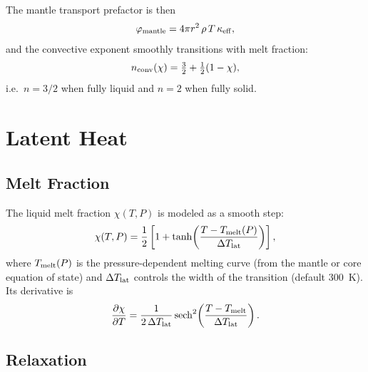 \documentclass{aastex631}
\newcommand{\pp}{\partial}
\newcommand{\Tmelt}{T_{\rm melt}}
\begin{document}
The mantle transport prefactor is then
\begin{equation}\label{eq:phi_mantle}
  \varphi_{\rm mantle}
  = 4\pi r^2\,\rho\,T\,\kappa_{\rm eff},
\end{equation}
and the convective exponent smoothly transitions with melt fraction:
\begin{equation}\label{eq:nconv_mantle}
  n_{\rm conv}(\chi)
  = \tfrac{3}{2} + \tfrac{1}{2}(1-\chi),
\end{equation}
i.e.\ $n=3/2$ when fully liquid and $n=2$ when fully solid.

\section{Latent Heat}\label{sec:latent}

\subsection{Melt Fraction}

The liquid melt fraction $\chi(T,P)$ is modeled as a smooth step:
\begin{equation}\label{eq:chi}
  \chi(T,P)
  = \frac{1}{2}\left[1 + \tanh\!\left(
      \frac{T - \Tmelt(P)}{\Delta T_{\rm lat}}
    \right)\right],
\end{equation}
where $\Tmelt(P)$ is the pressure-dependent melting curve (from the
mantle or core equation of state) and $\Delta T_{\rm lat}$ controls the
width of the transition (default 300~K).  Its derivative is
\begin{equation}\label{eq:dchidT}
  \frac{\pp\chi}{\pp T}
  = \frac{1}{2\,\Delta T_{\rm lat}}
    \,\mathrm{sech}^2\!\left(
      \frac{T - \Tmelt}{\Delta T_{\rm lat}}
    \right).
\end{equation}

\subsection{Relaxation}\label{sec:chi_relax}
\end{document}
